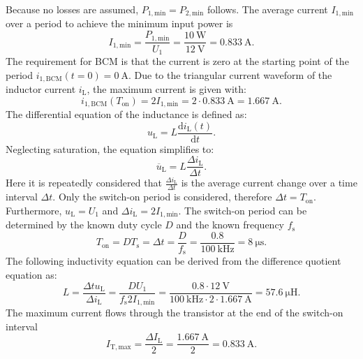 \begin{solutionblock}
    Because no losses are assumed, $P_{\mathrm{1,min}}=P_{\mathrm{2,min}}$ follows. The average current $I_{\mathrm{1,min}}$ over a period to achieve the minimum input power is
    \begin{equation}
        I_{\mathrm{1,min}} = \frac{P_{\mathrm{1,min}}}{U_{\mathrm{1}}} = \frac{\SI{10}{\watt}}{\SI{12}{\volt}}= \SI{0.833}{\ampere}.
    \end{equation}
    The requirement for BCM is that the current is zero at the starting point of the period  $i_\mathrm{1,BCM}(t=0)=\SI{0}{\ampere}$.
    Due to the triangular current waveform of the inductor current $i_{\mathrm{L}}$, the maximum current is given with:
    \begin{equation}
        i_\mathrm{1,BCM}(T_{\mathrm{on}})= 2I_{\mathrm{1,min}}= 2\cdot \SI{0.833}{\ampere} = \SI{1.667}{\ampere}.
    \end{equation}
    The differential equation of the inductance is defined as:
    \begin{equation}
        u_\mathrm{L}=L\frac{\mathrm{d}i_\mathrm{L}(t)}{\mathrm{d}t}.
    \end{equation}
    Neglecting saturation, the equation simplifies to:
    \begin{equation}
        \overline u_\mathrm{L}=L\frac{\Delta i_\mathrm{L}}{\Delta t}.
    \end{equation}
    Here it is repeatedly considered that $\frac{\Delta i_\mathrm{L}}{\Delta t}$ is the average current change over a time interval $\Delta t$. Only the switch-on period is considered, therefore $\Delta t = T_{\mathrm{on}}$. Furthermore, $u_\mathrm{L}=U_\mathrm{1}$ and $\Delta i_\mathrm{L} = 2 I_\mathrm{1,min}$.
    The switch-on period can be determined by the known duty cycle $D$ and the known frequency $f_{\mathrm{s}}$
    \begin{equation}
        T_{\mathrm{on}} = D T_{\mathrm{s}} = \Delta t = \frac{D}{f_{\mathrm{s}}} = \frac{0.8}{\SI{100}{\kilo\hertz}}=\SI{8}{\micro\second}.
    \end{equation}
    The following inductivity equation can be derived from the difference quotient equation as:
    \begin{equation}
        L=\frac{\Delta t u_\mathrm{L} }{\Delta i_\mathrm{L}}= \frac{D U_\mathrm{1}}{f_{\mathrm{s}}2I_{\mathrm{1,min}}} = \frac{0.8 \cdot \SI{12}{\volt}}{\SI{100}{\kilo\hertz\cdot 2\cdot \SI{1.667}{\ampere}}} = \SI{57.6}{\micro\henry}.
    \end{equation}
    The maximum current flows through the transistor at the end of the switch-on interval
    \begin{equation}
        I_\mathrm{T,max} = \frac{\Delta I_\mathrm{L}}{2}=\frac{\SI{1.667}{\ampere}}{2} = \SI{0.833}{\ampere}.
    \end{equation}
\end{solutionblock}


